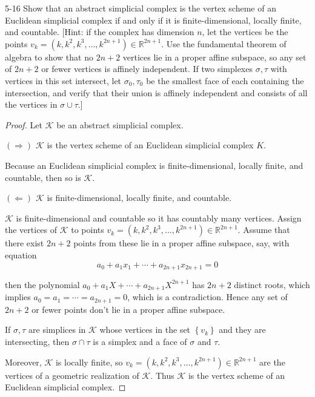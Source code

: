 \begin{problem}{5-16}\label{problem:5-16}
Show that an abstract simplicial complex is the vertex scheme of an Euclidean simplicial complex if and only if it is finite-dimensional, locally finite, and countable. [Hint: if the complex has dimension \(n\), let the vertices be the points \( v_k = (k, k^2, k^3, \dots, k^{2n+1}) \in \mathbb{R}^{2n+1} \). Use the fundamental theorem of algebra to show that no \( 2n+2 \) vertices lie in a proper affine subspace, so any set of \( 2n+2 \) or fewer vertices is affinely independent. If two simplexes \( \sigma, \tau \) with vertices in this set intersect, let \( \sigma_{0}, \tau_{0} \) be the smallest face of each containing the intersection, and verify that their union is affinely independent and consists of all the vertices in \( \sigma \cup \tau \).]
\end{problem}

\begin{proof}
	Let \( \mathcal{K} \) be an abstract simplicial complex.

	\( (\Longrightarrow) \) \( \mathcal{K} \) is the vertex scheme of an Euclidean simplicial complex \( K \).

	Because an Euclidean simplicial complex is finite-dimensional, locally finite, and countable, then so is \( \mathcal{K} \).

	\( (\Longleftarrow) \) \( \mathcal{K} \) is finite-dimensional, locally finite, and countable.

	\( \mathcal{K} \) is finite-dimensional and countable so it has countably many vertices. Assign the vertices of \( \mathcal{K} \) to points \( v_{k} = (k, k^{2}, k^{3}, \ldots, k^{2n+1}) \in \mathbb{R}^{2n+1} \). Assume that there exist \( 2n + 2 \) points from these lie in a proper affine subspace, say, with equation
	\[
		a_{0} + a_{1}x_{1} + \cdots + a_{2n+1}x_{2n+1} = 0
	\]

	then the polynomial \( a_{0} + a_{1}X + \cdots + a_{2n+1}X^{2n+1} \) has \( 2n + 2 \) distinct roots, which implies \( a_{0} = a_{1} = \cdots = a_{2n+1} = 0 \), which is a contradiction. Hence any set of \( 2n + 2 \) or fewer points don't lie in a proper affine subspace.

	If \( \sigma, \tau \) are simplices in \( \mathcal{K} \) whose vertices in the set \( \left\{ v_{k} \right\} \) and they are intersecting, then \( \sigma \cap \tau \) is a simplex and a face of \( \sigma \) and \( \tau \).

	Moreover, \( \mathcal{K} \) is locally finite, so \( v_{k} = (k, k^{2}, k^{3}, \ldots, k^{2n+1}) \in \mathbb{R}^{2n+1} \) are the vertices of a geometric realization of \( \mathcal{K} \). Thus \( \mathcal{K} \) is the vertex scheme of an Euclidean simplicial complex.
\end{proof}

